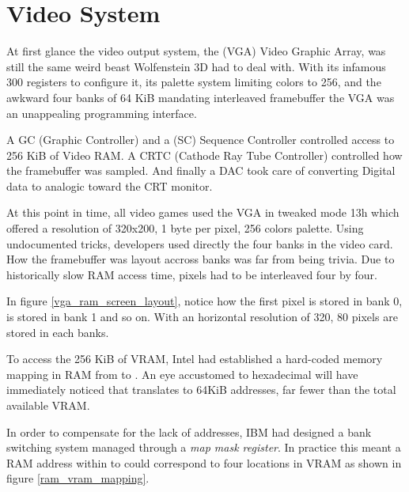 \section{Video System}
At first glance the video output system, the (VGA) Video Graphic Array, was still the same weird beast Wolfenstein 3D had to deal with. With its infamous 300 registers to configure it, its palette system limiting colors to 256, and the awkward four banks of 64 KiB mandating interleaved framebuffer the VGA was an unappealing programming interface.\\
\par
A GC (Graphic Controller) and a (SC) Sequence Controller controlled access to 256 KiB of Video RAM. A CRTC (Cathode Ray Tube Controller) controlled how the framebuffer was sampled. And finally a DAC took care of converting Digital data to analogic toward the CRT monitor.\\
\par 	
{}
\par
At this point in time, all video games used the VGA in tweaked mode 13h which offered a resolution of 320x200, 1 byte per pixel, 256 colors palette. Using undocumented tricks, developers used directly the four banks in the video card. How the framebuffer was layout accross banks was far from being trivia. Due to historically slow RAM access time, pixels had to be interleaved four by four.\\
\par
\par
{}
\par
In figure \ref{vga_ram_screen_layout}, notice how the first pixel  is stored in bank 0,  is stored in bank 1 and so on. With an horizontal resolution of 320, 80 pixels are stored in each banks.\\
\par
To access the 256 KiB of VRAM, Intel had established a hard-coded memory mapping in RAM from  to . An eye accustomed to hexadecimal will have immediately noticed that  translates to 64KiB addresses, far fewer than the total available VRAM.\\
\par
 In order to compensate for the lack of addresses, IBM had designed a bank switching system managed through a \textit{map mask register}. In practice this meant a RAM address within  to  could correspond to four locations in VRAM as shown in figure \ref{ram_vram_mapping}.\\


